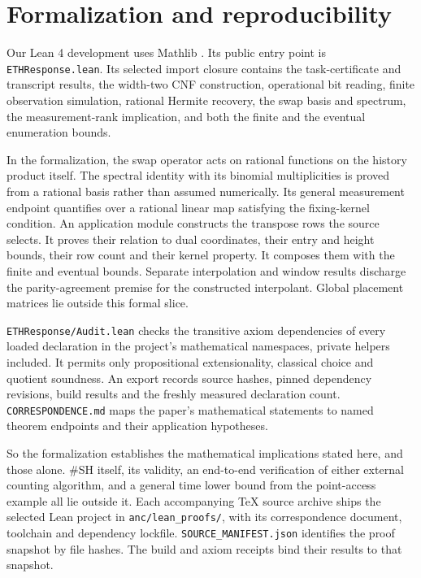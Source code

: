 \documentclass[11pt,letterpaper]{article}
\begin{document}
\section{Formalization and
reproducibility}\label{formalization-and-reproducibility}

Our Lean 4 development uses Mathlib \citep{Lean4, Mathlib20}. Its public
entry point is \texttt{ETHResponse.lean}. Its selected import closure
contains the task-certificate and transcript results, the width-two CNF
construction, operational bit reading, finite observation simulation,
rational Hermite recovery, the swap basis and spectrum, the
measurement-rank implication, and both the finite and the eventual
enumeration bounds.

In the formalization, the swap operator acts on rational functions on
the history product itself. The spectral identity with its binomial
multiplicities is proved from a rational basis rather than assumed
numerically. Its general measurement endpoint quantifies over a rational
linear map satisfying the fixing-kernel condition. An application module
constructs the transpose rows the source selects. It proves their
relation to dual coordinates, their entry and height bounds, their row
count and their kernel property. It composes them with the finite and
eventual bounds. Separate interpolation and window results discharge the
parity-agreement premise for the constructed interpolant. Global
placement matrices lie outside this formal slice.

\texttt{ETHResponse/\allowbreak{}Audit.\allowbreak{}lean} checks the
transitive axiom dependencies of every loaded declaration in the
project's mathematical namespaces, private helpers included. It permits
only propositional extensionality, classical choice and quotient
soundness. An export records source hashes, pinned dependency revisions,
build results and the freshly measured declaration count.
\texttt{CORRESPONDENCE.md} maps the paper's mathematical statements to
named theorem endpoints and their application hypotheses.

So the formalization establishes the mathematical implications stated
here, and those alone. \#SH itself, its validity, an end-to-end
verification of either external counting algorithm, and a general time
lower bound from the point-access example all lie outside it. Each
accompanying TeX source archive ships the selected Lean project in
\texttt{anc/\allowbreak{}lean\_\allowbreak{}proofs/\allowbreak{}}, with
its correspondence document, toolchain and dependency lockfile.
\texttt{SOURCE\_MANIFEST.json} identifies the proof snapshot by file
hashes. The build and axiom receipts bind their results to that
snapshot.
\end{document}
